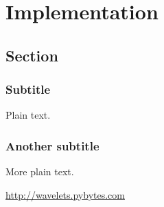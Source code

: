
\chapter{Implementation}

\section{Section}

\subsection{Subtitle}

Plain text.

\subsection{Another subtitle}

More plain text.



\url{http://wavelets.pybytes.com}

